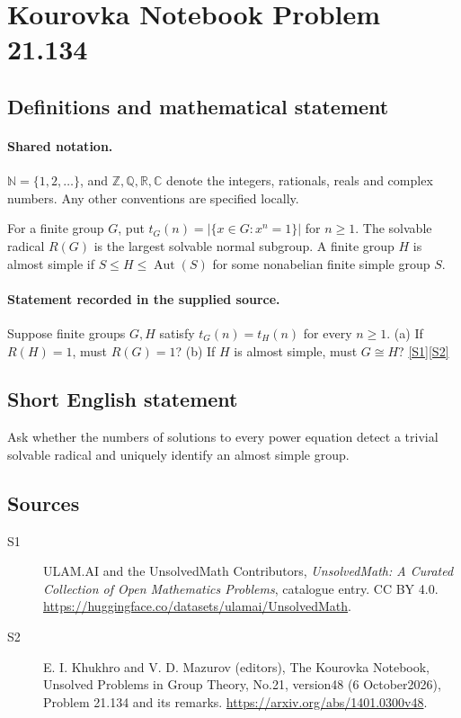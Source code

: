 \documentclass[11pt]{article}
\newcommand{\sref}[2]{\hyperlink{source:#1:#2}{[S#2]}}
\begin{document}
\section{Kourovka Notebook Problem 21.134}\label{statement}

\subsection{Definitions and mathematical statement}

\paragraph{Shared notation.}$\mathbb N=\{1,2,\ldots\}$, and $\mathbb Z,\mathbb Q,\mathbb R,\mathbb C$ denote the integers, rationals, reals and complex numbers. Any other conventions are specified locally.


For a finite group $G$, put $t_G(n)=|\{x\in G:x^n=1\}|$ for $n\geq1$. The solvable radical $R(G)$ is the largest solvable normal subgroup. A finite group $H$ is almost simple if $S\leq H\leq\operatorname{Aut}(S)$ for some nonabelian finite simple group $S$.
\paragraph{Statement recorded in the supplied source.}
Suppose finite groups $G,H$ satisfy $t_G(n)=t_H(n)$ for every $n\geq1$. (a) If $R(H)=1$, must $R(G)=1$? (b) If $H$ is almost simple, must $G\cong H$? \sref{statement}{1}\sref{statement}{2}
\subsection{Short English statement}
Ask whether the numbers of solutions to every power equation detect a trivial solvable radical and uniquely identify an almost simple group.
\subsection{Sources}
\begin{description}
\item[\hypertarget{source:statement:1}{S1}] ULAM.AI and the UnsolvedMath Contributors, \emph{UnsolvedMath: A Curated Collection of Open Mathematics Problems}, catalogue entry. CC BY 4.0. \url{https://huggingface.co/datasets/ulamai/UnsolvedMath}.
\item[\hypertarget{source:statement:2}{S2}] E. I. Khukhro and V. D. Mazurov (editors), The Kourovka Notebook, Unsolved Problems in Group Theory, No.21, version48 (6 October2026), Problem 21.134 and its remarks. \url{https://arxiv.org/abs/1401.0300v48}.
\end{description}
\label{end:statement}
\end{document}
